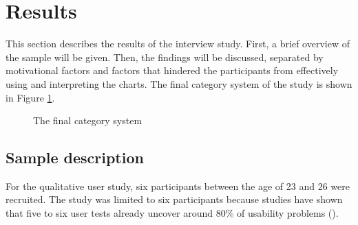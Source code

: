 \section{Results}
This section describes the results of the interview study. First, a brief overview of the sample will be given. Then, the findings will be discussed, separated by motivational factors and factors that hindered the participants from effectively using and interpreting the charts. The final category system of the study is shown in Figure \ref{fig:category_system}.

\begin{figure}[htb!]
    \centering
    \caption{The final category system}
    \label{fig:category_system}
\end{figure}

\subsection{Sample description}
For the qualitative user study, six participants between the age of 23 and 26 were recruited. The study was limited to six participants because studies have shown that five to six user tests already uncover around 80\% of usability problems (\cite{10.1145/169059.169166}).

